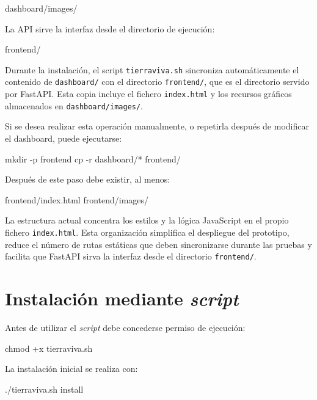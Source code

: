 \begin{terminaloutput}
dashboard/images/
\end{terminaloutput}

La API sirve la interfaz desde el directorio de ejecución:

\begin{terminaloutput}
frontend/
\end{terminaloutput}

Durante la instalación, el script \texttt{tierraviva.sh} sincroniza automáticamente el contenido de \texttt{dashboard/} con el directorio \texttt{frontend/}, que es el directorio servido por FastAPI. Esta copia incluye el fichero \texttt{index.html} y los recursos gráficos almacenados en \texttt{dashboard/images/}.

Si se desea realizar esta operación manualmente, o repetirla después de modificar el dashboard, puede ejecutarse:

\begin{bashcode}
mkdir -p frontend
cp -r dashboard/* frontend/
\end{bashcode}

Después de este paso debe existir, al menos:

\begin{terminaloutput}
frontend/index.html
frontend/images/
\end{terminaloutput}

La estructura actual concentra los estilos y la lógica JavaScript en el propio fichero \texttt{index.html}. Esta organización simplifica el despliegue del prototipo, reduce el número de rutas estáticas que deben sincronizarse durante las pruebas y facilita que FastAPI sirva la interfaz desde el directorio \texttt{frontend/}.

\section{Instalación mediante \textit{script}}

Antes de utilizar el \textit{script} debe concederse permiso de ejecución:

\begin{bashcode}
chmod +x tierraviva.sh
\end{bashcode}

La instalación inicial se realiza con:

\begin{bashcode}
./tierraviva.sh install
\end{bashcode}

